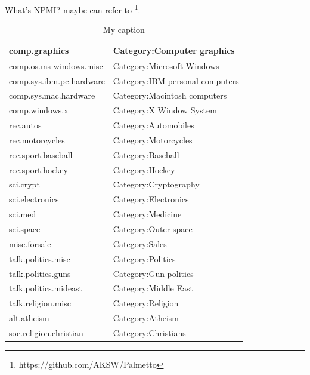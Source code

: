 \documentclass[conference,compsoc]{IEEEtran}
\begin{document}
What's NPMI? maybe can refer to \cite{Aletras2013EvaluatingTC}\cite{Rder2015ExploringTS}\footnote{https://github.com/AKSW/Palmetto}.
\begin{table}[]
\centering
\caption{My caption}
\label{my-label}
\begin{tabular}{|l|l|}
\hline
comp.graphics            & Category:Computer graphics      \\ \hline
comp.os.ms-windows.misc  & Category:Microsoft Windows      \\ \hline
comp.sys.ibm.pc.hardware & Category:IBM personal computers \\ \hline
comp.sys.mac.hardware    & Category:Macintosh computers    \\ \hline
comp.windows.x           & Category:X Window System        \\ \hline
rec.autos                & Category:Automobiles            \\ \hline
rec.motorcycles          & Category:Motorcycles            \\ \hline
rec.sport.baseball       & Category:Baseball               \\ \hline
rec.sport.hockey         & Category:Hockey                 \\ \hline
sci.crypt                & Category:Cryptography           \\ \hline
sci.electronics          & Category:Electronics            \\ \hline
sci.med                  & Category:Medicine               \\ \hline
sci.space                & Category:Outer space            \\ \hline
misc.forsale             & Category:Sales                  \\ \hline
talk.politics.misc       & Category:Politics               \\ \hline
talk.politics.guns       & Category:Gun politics          \\ \hline
talk.politics.mideast    & Category:Middle East           \\ \hline
talk.religion.misc       & Category:Religion               \\ \hline
alt.atheism              & Category:Atheism                \\ \hline
soc.religion.christian   & Category:Christians             \\ \hline
\end{tabular}
\end{table}
\end{document}
